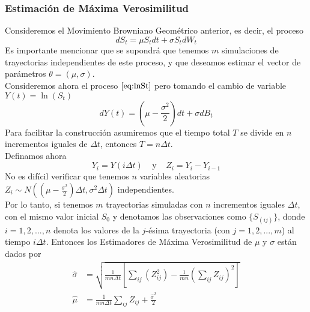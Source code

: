 \documentclass[11pt,notitlepage]{article}
\begin{document}
\subsubsection{Estimación de Máxima Verosimilitud}
Consideremos el Movimiento Browniano Geométrico anterior, es decir, el proceso
\begin{equation*}
    dS_t = \mu S_t dt + \sigma S_t dW_t
\end{equation*}
Es importante mencionar que se supondrá que tenemos $m$ simulaciones de trayectorias independientes de este proceso, y que deseamos estimar el vector de parámetros $\theta = (\mu, \sigma)$.\\
Consideremos ahora el proceso $\eqref{eq:lnSt}$ pero tomando el cambio de variable $Y(t) = \ln{(S_t)}$
\begin{equation*}
    dY(t) = \left( \mu - \frac{\sigma^2}{2} \right) dt + \sigma dB_t
\end{equation*}
Para facilitar la construcción asumiremos que el tiempo total $T$ se divide en $n$ incrementos iguales de $\Delta t$, entonces $T = n\Delta t$.\\
Definamos ahora 
$$Y_i = Y(i \Delta t) \ \ \ \ \ \mbox{y} \ \ \ \ \ Z_i = Y_i - Y_{i-1}$$
No es difícil verificar que tenemos $n$ variables aleatorias $Z_i \sim N((\mu - \frac{\sigma^2}{2}) \Delta t, \sigma^2 \Delta t)$ independientes.\\
Por lo tanto, si tenemos $m$ trayectorias simuladas con $n$ incrementos iguales $\Delta t$, con el mismo valor inicial $S_0$ y denotamos las observaciones como $\{ S_{(ij)} \}$, donde $i = 1, 2, ..., n$ denota los valores de la $j$-ésima trayectoria (con $j = 1, 2, ..., m$) al tiempo $i\Delta t$. Entonces los Estimadores de Máxima Verosimilitud de $\mu$ y $\sigma$ están dados por
\begin{align*}
    \hat{\sigma} &= \sqrt{\frac{1}{ m n \Delta t} \left[ \sum_{ij} (Z_{ij}^2) - \frac{1}{m n} \left( \sum_{ij} Z_{ij} \right)^2\right]} \\
    \hat{\mu} &= \frac{1}{m n \Delta t} \sum_{ij} Z_{ij} + \frac{\hat{\sigma}^2}{2}
\end{align*}

        
\end{document}
